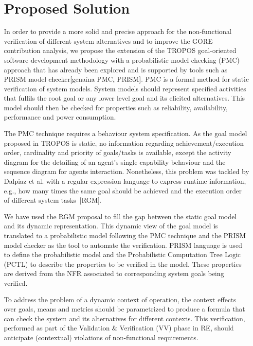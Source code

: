 

\section{Proposed Solution}

In order to provide a more solid and precise approach for the non-functional verification of different system alternatives and to improve the GORE contribution analysis, we propose the extension of the TROPOS goal-oriented software development methodology with a probabilistic model checking (PMC) approach that has already been explored and is supported by tools such as PRISM model checker[genaína PMC, PRISM]. PMC is a formal method for static verification of system models. System models should represent specified activities that fulfils the root goal or any lower level goal and its elicited alternatives. This model should then be checked for properties such as reliability, availability, performance and power consumption.

The PMC technique requires a behaviour system specification. As the goal model proposed in TROPOS is static, no information regarding achievement/execution order, cardinality and priority of goals/tasks is available, except the activity diagram for the detailing of an agent's single capability behaviour and the sequence diagram for agents interaction. Nonetheless, this problem was tackled by Dalpiaz et al. with a regular expression language to express runtime information, e.g., how many times the same goal should be achieved and the execution order of different system tasks~[RGM]. 

We have used the RGM proposal to fill the gap between the static goal model and its dynamic representation. This dynamic view of the goal model is translated to a probabilistic model following the PMC technique and the PRISM model checker as the tool to automate the verification. PRISM language is used to define the probabilistic model and the Probabilistic Computation Tree Logic (PCTL) to describe the properties to be verified in the model. These properties are derived from the NFR associated to corresponding system goals being verified.

To address the problem of a dynamic context of operation, the context effects over goals, means and metrics should be parametrized to produce a formula that can check the system and its alternatives for different contexts. This verification, performed as part of the Validation \& Verification (VV) phase in RE, should anticipate (contextual) violations of non-functional requirements. 

